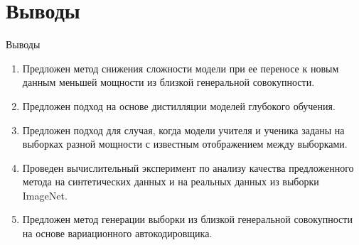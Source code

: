 \documentclass[10pt,pdf,hyperref={unicode}]{beamer}
\begin{document}
\section{Выводы}
\begin{frame}{Выводы}
\justifying
	\begin{enumerate}
	\justifying
	    \item Предложен метод снижения сложности модели при ее переносе к новым данным меньшей мощности из близкой генеральной совокупности.
        \item Предложен подход на основе дистилляции моделей глубокого обучения.
        \item Предложен подход для случая, когда модели учителя и ученика заданы на выборках разной мощности с известным отображением между выборками.
        \item Проведен вычислительный эксперимент по анализу качества предложенного метода на синтетических данных и на реальных данных из выборки ImageNet.
        \item Предложен метод генерации выборки из близкой генеральной совокупности на основе вариационного автокодировщика.
	\end{enumerate}
\end{frame}
\end{document}
